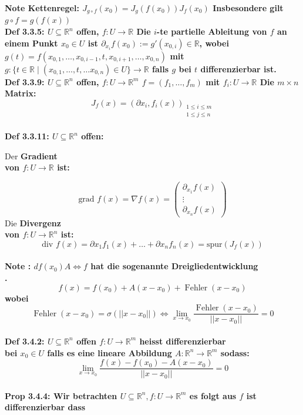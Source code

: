\documentclass[7pt,landscape, margin = 0.1mm]{article}
\newcommand{\COL}[1]{ \color{chaptercolor} \bf{#1}\color{black}     \\}
\newcommand{\DEF}[2]{\color{chaptercolor}\bf{Def #1}:\color{black}    \hspace{0.2cm} #2 \\}
\newcommand{\NOTE}[2]{\color{chaptercolor}\bf{Note #1}:\color{black}    \hspace{0.2cm} #2 \\}
\newcommand{\PROP}[2]{\color{chaptercolor}\bf{Prop #1}:\color{black}    \hspace{0.2cm} #2 \\}
\begin{document}
\begin{multicols}{4}
\begin{flushleft}
\NOTE{Kettenregel}{
$J_{g \circ f}\left(x_0\right)=J_g\left(f\left(x_0\right)\right) J_f\left(x_0\right)$
Insbesondere gilt $g\circ f = g(f(x))$}

\DEF{3.3.5}{$U \subseteq \mathbb{R}^{n}$ offen, $f:U\to \mathbb{R}$
Die $i$-te partielle Ableitung von $f$ an einem Punkt $x_{0}\in U$ ist $\partial_{x_{i}} f(x_{0}):=g'(x_{0,i})\in \mathbb{R}$, wobei $g(t)=f(x_{0,1},\dots,x_{0,i-1},t,x_{0,i+1},\dots,x_{0,n})$ mit $g: \{ t \in \mathbb{R} \mid (x_{0,1},\dots,t, \dots x_{0,n}) \in U\}\to \mathbb{R}$ falls $g$ bei $t$ differenzierbar ist.}

\DEF{3.3.9}{$U \subseteq \mathbb{R}^{n}$ offen, $f:U\to \mathbb{R}^{m}$
$f=(f_{1},\dots,f_{m})$ mit $f_{i}:U\to \mathbb{R}$
Die $m \times n$ Matrix:$$J_{f}(x)=\left(\partial x_{i}, f_{i}(x)\right)_{\substack{1 \leqslant i \leqslant m \\1 \leqslant j \leqslant n}}$$}

\DEF{3.3.11}{$U \subseteq \mathbb{R}^{n}$ offen:
     
Der \COL{Gradient} von $f:U\to \mathbb{R}$ ist:
     
 $$\text{grad } f(x) = \nabla f(x)= \left(\begin{array}{c}
     
 \partial_{x_1} f\left(x\right) \\
     
 \vdots \\
     
  \partial_{x_n} f\left(x\right)
     
  \end{array}\right)$$
  Die \COL{Divergenz} von $f:U \to \mathbb{R}^{n}$ ist:$$\text{div } f(x)=\partial x_{1}f_{1}(x)+\dots+\partial x_{n}f_{n}(x)=\text{spur}(J_{f}(x))$$}
 
\NOTE{}{$df \left( x_{0}\right)A \Leftrightarrow f$ hat die sogenannte \COL{Dreigliedentwicklung}.
$$
f(x)=f(x_{0})+A(x-x_{0})+ \operatorname{Fehler} \left(x-x_{0} \right)
$$
wobei $$\operatorname{Fehler}\left( x-x_{0}\right) = \sigma \left(||x-x_{0}|| \right) \Leftrightarrow \lim_{x \to x_{0}} \frac{\operatorname{Fehler}\left( x-x_{0}\right)}{||x-x_{0}||}=0$$} 
  
 \DEF{3.4.2}{$U \subseteq \mathbb{R}^{n}$ offen $f:U\to \mathbb{R}^{m}$ heisst \COL{differenzierbar } bei $x_{0}\in U$ falls es eine lineare Abbildung $A:\mathbb{R}^{n}\to \mathbb{R}^{m}$ sodass: $$\lim_{ x \to x_{0} } \frac{f(x)-f(x_{0})-A(x-x_{0})}{|| x-x_{0}||}=0$$}
 

\PROP{3.4.4}{Wir betrachten $U \subseteq \mathbb{R}^{n}, f: U \to \mathbb{R}^{m}$
es folgt aus $f$ ist differenzierbar dass
\begin{enumerate}



\end{enumerate}}
\end{flushleft}
\end{multicols}
\end{document}
